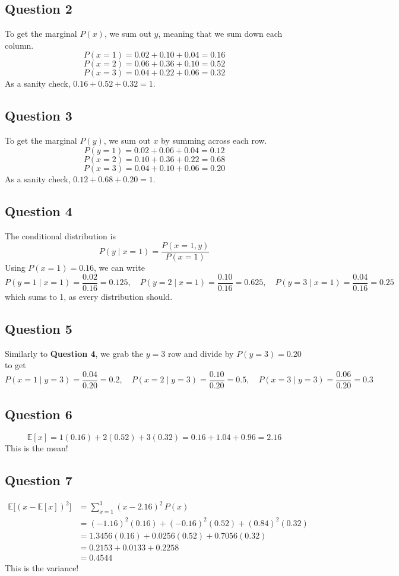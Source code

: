 \documentclass[11pt]{article}
\newcommand{\E}{\mathbb{E}}
\begin{document}
\subsection*{Question 2}
To get the marginal $P(x)$, we sum out $y$, meaning that we sum down each column.
\[
P(x=1)=0.02+0.10+0.04=0.16
\]
\[
P(x=2)=0.06+0.36+0.10=0.52
\]
\[
P(x=3)=0.04+0.22+0.06=0.32
\]
As a sanity check, $0.16+0.52+0.32=1$.

\subsection*{Question 3}
To get the marginal $P(y)$, we sum out $x$ by summing across each row.
\[
P(y=1)=0.02+0.06+0.04=0.12
\]
\[
P(x=2)=0.10+0.36+0.22=0.68
\]
\[
P(x=3)=0.04+0.10+0.06=0.20
\]
As a sanity check, $0.12+0.68+0.20=1$.

\subsection*{Question 4}
The conditional distribution is
\[
P(y\mid x=1)=\frac{P(x=1,y)}{P(x=1)}
\]
Using $P(x=1)=0.16$, we can write
\[
P(y=1\mid x=1)=\frac{0.02}{0.16}=0.125,\quad
P(y=2\mid x=1)=\frac{0.10}{0.16}=0.625,\quad
P(y=3\mid x=1)=\frac{0.04}{0.16}=0.25
\]
which sums to 1, as every distribution should.

\subsection*{Question 5}
Similarly to \textbf{Question 4}, we grab the $y=3$ row and divide by $P(y=3)=0.20$ to get
\[
P(x=1\mid y=3)=\frac{0.04}{0.20}=0.2,\quad
P(x=2\mid y=3)=\frac{0.10}{0.20}=0.5,\quad
P(x=3\mid y=3)=\frac{0.06}{0.20}=0.3
\]

\subsection*{Question 6}
\[
\E[x]=1(0.16)+2(0.52)+3(0.32)=0.16+1.04+0.96=2.16
\]
This is the mean!

\subsection*{Question 7}
\begin{align*}
\E\big[(x-\E[x])^2\big]&=\sum_{x=1}^{3}(x-2.16)^2\,P(x)\\
&=(-1.16)^2(0.16)+(-0.16)^2(0.52)+(0.84)^2(0.32)\\
&=1.3456(0.16)+0.0256(0.52)+0.7056(0.32)\\
&=0.2153+0.0133+0.2258\\
&=0.4544
\end{align*}
This is the variance!
\end{document}
